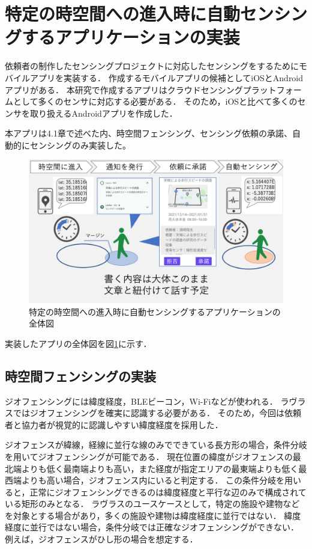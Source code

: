 \section{特定の時空間への進入時に自動センシングするアプリケーションの実装}
\label{myApp}
依頼者の制作したセンシングプロジェクトに対応したセンシングをするためにモバイルアプリを実装する．
作成するモバイルアプリの候補としてiOSとAndroidアプリがある．
本研究で作成するアプリはクラウドセンシングプラットフォームとして多くのセンサに対応する必要がある．
そのため，iOSと比べて多くのセンサを取り扱えるAndroidアプリを作成した．

本アプリは4.1章で述べた内、時空間フェンシング、センシング依頼の承諾、自動的にセンシングのみ実装した。

\begin{figure}[tbh]
    \centering
    \includegraphics[width=16cm]{img_myApp.png}
    \caption{特定の時空間への進入時に自動センシングするアプリケーションの全体図}
    \label{fig:myApp}
\end{figure}

実装したアプリの全体図を図\ref{fig:myApp}に示す．


\subsection{時空間フェンシングの実装}
\label{myApp_STF}
ジオフェンシングには緯度経度，BLEビーコン，Wi-Fiなどが使われる．
ラヴラスではジオフェンシングを確実に認識する必要がある．
そのため，今回は依頼者と協力者が視覚的に認識しやすい緯度経度を採用した．

ジオフェンスが緯線，経線に並行な線のみでできている長方形の場合，条件分岐を用いてジオフェンシングが可能である．
現在位置の緯度がジオフェンスの最北端よりも低く最南端よりも高い，また経度が指定エリアの最東端よりも低く最西端よりも高い場合，ジオフェンス内にいると判定する．
この条件分岐を用いると，正常にジオフェンシングできるのは緯度経度と平行な辺のみで構成されている矩形のみとなる．
ラヴラスのユースケースとして，特定の施設や建物などを対象とする場合があり，多くの施設や建物は緯度経度に並行ではない．
緯度経度に並行ではない場合，条件分岐では正確なジオフェンシングができない．
例えば，ジオフェンスがひし形の場合を想定する．


